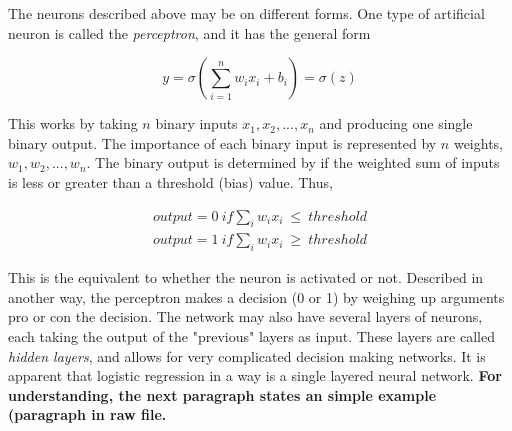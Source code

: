 \documentclass[a4paper,11pt,twocolumn]{article}
\begin{document}
The neurons described above may be on different forms. One type of artificial neuron is called the \textit{perceptron}, and it has the general form 

\begin{equation}
y = \sigma (\sum\limits_{i=1}^n w_ix_i + b_i) = \sigma (z)
\label{neu1}
\end{equation}

This works by taking $n$ binary inputs $x_1,x_2,...,x_n$ and producing one single binary output. The importance of each binary input is represented by $n$ weights, $w_1,w_2,...,w_n$. The binary output is determined by if the weighted sum of inputs is less or greater than a threshold (bias) value. Thus,

\begin{equation*}
\begin{aligned}
output = 0 \ if \sum_i w_ix_i \ \leq \ threshold \\
output = 1 \ if \sum_i w_ix_i \ \geq \ threshold
\end{aligned}
\end{equation*}

This is the equivalent to whether the neuron is activated or not. Described in another way, the perceptron makes a decision (0 or 1) by weighing up arguments pro or con the decision. The network may also have several layers of neurons, each taking the output of the "previous" layers as input. These layers are called \textit{hidden layers}, and allows for very complicated decision making networks. It is apparent that logistic regression in a way is a single layered neural network. \textbf{For understanding, the next paragraph states an simple example (paragraph in raw file.}
\\ 

\end{document}
